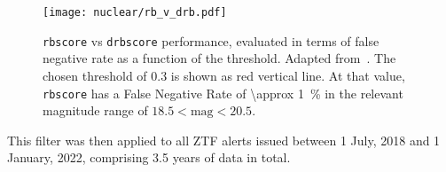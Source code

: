 \begin{figure}[htpb]
    \texttt{[image: nuclear/rb\_v\_drb.pdf]}
    \caption[\texttt{rbscore}/\texttt{drbscore} performance]{\texttt{rbscore} vs \texttt{drbscore} performance, evaluated in terms of false negative rate as a function of the threshold. Adapted from~\cite{Duev2019}. The chosen threshold of 0.3 is shown as red vertical line. At that value, \texttt{rbscore} has a False Negative Rate of \SI{\approx 1}{\percent} in the relevant magnitude range of $18.5 < \text{mag} < 20.5$.}
\end{figure}

This filter was then applied to all ZTF alerts issued between 1 July, 2018 and 1 January, 2022, comprising 3.5 years of data in total.